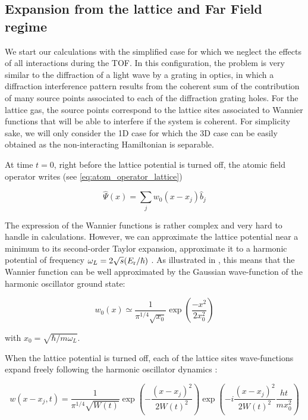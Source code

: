 \subsection{Expansion from the lattice and Far Field regime}

We start our calculations with the simplified case for which we neglect the effects of all interactions during the TOF. In this configuration, the problem is very similar to the diffraction of a light wave by a grating in optics, in which a diffraction interference pattern results from the coherent sum of the contribution of many source points associated to each of the diffraction grating holes. For the lattice gas, the source points correspond to the lattice sites associated to Wannier functions that will be able to interfere if the system is coherent. For simplicity sake, we will only consider the 1D case for which the 3D case can be easily obtained as the non-interacting Hamiltonian is separable.

At time $t=0$, right before the lattice potential is turned off, the atomic field operator writes (see \ref{eq:atom_operator_lattice})

\begin{equation}
    \hat{\Psi}(x)= \sum_{j} w_{0}(x-x_j) \hat{b}_{j} 
    \label{eq:field_operator}
\end{equation}



The expression of the Wannier functions is rather complex and very hard to handle in calculations. However, we can approximate the lattice potential near a minimum to its second-order Taylor expansion, \ie approximate it to a harmonic potential of frequency $\omega_L=2 \sqrt{s} (E_{\rm{r}}/\hbar)$ \cite{toth2008theory}. As illustrated in , this means that the Wannier function can be well approximated by the Gaussian wave-function of the harmonic oscillator ground state:

\begin{equation}
    w_0(x) \simeq \frac{1}{\pi^{1 / 4} \sqrt{x_{0}}} \exp \left(\frac{-x^{2}}{2 x_{0}^{2}}\right)
\end{equation}

\noindent with $x_{0}=\sqrt{\hbar / m \omega_{L}}$.

When the lattice potential is turned off, each of the lattice sites wave-functions expand freely following the harmonic oscillator dynamics \cite{toth2008theory}:

\begin{equation}
    w\left(x-x_{j}, t\right)=\frac{1}{\pi^{1 / 4} \sqrt{W(t)}} \exp \left(-\frac{\left(x-x_{j}\right)^{2}}{2 W(t)^{2}}\right) \exp \left(-i \frac{\left(x-x_{j}\right)^{2}}{2 W(t)^{2}} \frac{h t}{m x_{0}^{2}}\right)
    \label{eq:time_dependent_wannier}
\end{equation}

